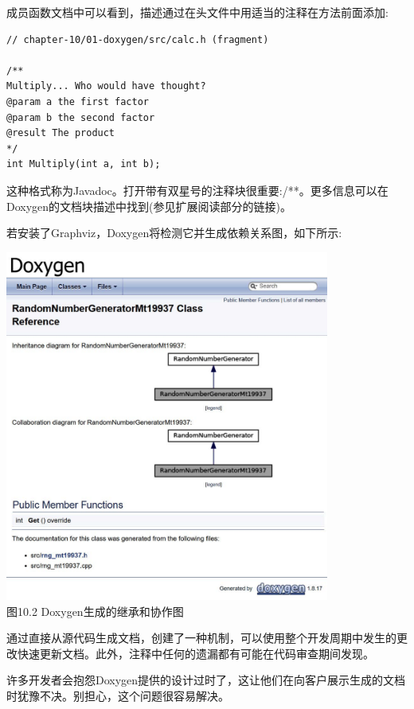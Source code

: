 成员函数文档中可以看到，描述通过在头文件中用适当的注释在方法前面添加:

\begin{lstlisting}[style=styleCXX]
// chapter-10/01-doxygen/src/calc.h (fragment)

/**
Multiply... Who would have thought?
@param a the first factor
@param b the second factor
@result The product
*/
int Multiply(int a, int b);
\end{lstlisting}

这种格式称为Javadoc。打开带有双星号的注释块很重要:/**。更多信息可以在Doxygen的文档块描述中找到(参见扩展阅读部分的链接)。

若安装了Graphviz，Doxygen将检测它并生成依赖关系图，如下所示:

\begin{center}
\includegraphics[width=0.8\textwidth]{content/3/chapter10/images/2.jpg}\\
图10.2 Doxygen生成的继承和协作图
\end{center}

通过直接从源代码生成文档，创建了一种机制，可以使用整个开发周期中发生的更改快速更新文档。此外，注释中任何的遗漏都有可能在代码审查期间发现。

许多开发者会抱怨Doxygen提供的设计过时了，这让他们在向客户展示生成的文档时犹豫不决。别担心，这个问题很容易解决。










